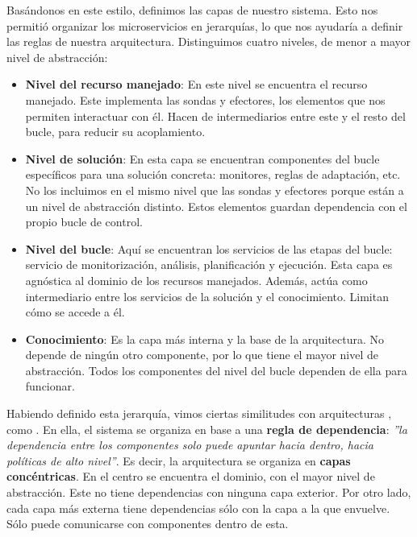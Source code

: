 Basándonos en este estilo, definimos las capas de nuestro sistema. Esto nos permitió organizar los microservicios en jerarquías, lo que nos ayudaría a definir las reglas de nuestra arquitectura. Distinguimos cuatro niveles, de menor a mayor nivel de abstracción:

\begin{itemize}
  \item \textbf{Nivel del recurso manejado}: En este nivel se encuentra el recurso manejado. Este implementa las sondas y efectores, los elementos que nos permiten interactuar con él. Hacen de intermediarios entre este y el resto del bucle, para reducir su acoplamiento.

  \item \textbf{Nivel de solución}: En esta capa se encuentran componentes del bucle específicos para una solución concreta: monitores, reglas de adaptación, etc. No los incluimos en el mismo nivel que las sondas y efectores porque están a un nivel de abstracción distinto. Estos elementos guardan dependencia con el propio bucle de control.

  \item \textbf{Nivel del bucle}: Aquí se encuentran los servicios de las etapas del bucle: servicio de monitorización, análisis, planificación y ejecución. Esta capa es agnóstica al dominio de los recursos manejados. Además, actúa como intermediario entre los servicios de la solución y el conocimiento. Limitan cómo se accede a él.

  \item \textbf{Conocimiento}: Es la capa más interna y la base de la arquitectura. No depende de ningún otro componente, por lo que tiene el mayor nivel de abstracción. Todos los componentes del nivel del bucle dependen de ella para funcionar.

\end{itemize}

Habiendo definido esta jerarquía, vimos ciertas similitudes con arquitecturas , como . \cite{martinChapter22Clean2018} En ella, el sistema se organiza en base a una \textbf{regla de dependencia}: \emph{''la dependencia entre los componentes solo puede apuntar hacia dentro, hacia políticas de alto nivel''}. Es decir, la arquitectura se organiza en \textbf{capas concéntricas}. En el centro se encuentra el dominio, con el mayor nivel de abstracción. Este no tiene dependencias con ninguna capa exterior. Por otro lado, cada capa más externa tiene dependencias sólo con la capa a la que envuelve. Sólo puede comunicarse con componentes dentro de esta.

